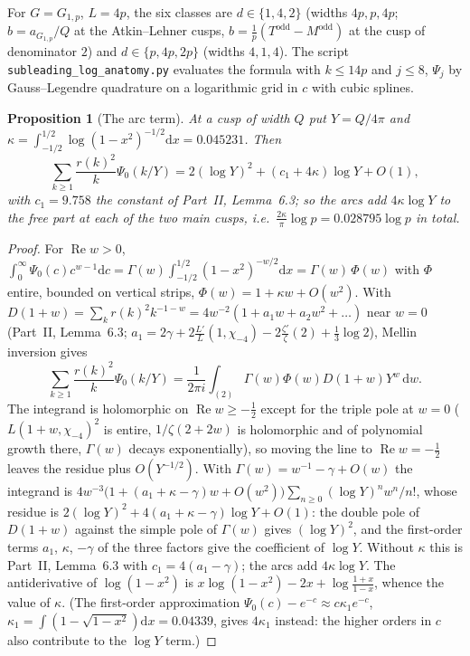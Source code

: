 \documentclass[11pt]{amsart}
\newtheorem{proposition}[theorem]{Proposition}
\theoremstyle{remark}
\newcommand{\dd}{\mathrm{d}}
\begin{document}
For $G=G_{1,p}$, $L=4p$, the six classes are $d\in\{1,4,2\}$ (widths $4p,p,4p$; $b=a_{G_{1,p}}/Q$ at the Atkin--Lehner cusps, $b=\frac1p(T^{\mathrm{odd}}-M^{\mathrm{odd}})$ at the cusp of denominator $2$) and $d\in\{p,4p,2p\}$ (widths $4,1,4$). The script \texttt{subleading\_log\_anatomy.py} evaluates the formula with $k\le14p$ and $j\le8$, $\Psi_j$ by Gauss--Legendre quadrature on a logarithmic grid in $c$ with cubic splines.

\begin{proposition}[The arc term]\label{prop:mellin}
At a cusp of width $Q$ put $Y=Q/4\pi$ and $\kappa=\int_{-1/2}^{1/2}\log(1-x^2)^{-1/2}\dd x=0.045231$. Then
\[
\sum_{k\ge1}\frac{r(k)^2}k\Psi_0(k/Y)=2(\log Y)^2+(c_1+4\kappa)\log Y+O(1),
\]
with $c_1=9.758$ the constant of Part~II, Lemma~6.3; so the arcs add $4\kappa\log Y$ to the free part at each of the two main cusps, i.e.\ $\frac{2\kappa}\pi\log p=0.028795\log p$ in total.
\end{proposition}
\begin{proof}
For $\operatorname{Re}w>0$, $\int_0^\infty\Psi_0(c)c^{w-1}\dd c=\Gamma(w)\int_{-1/2}^{1/2}(1-x^2)^{-w/2}\dd x=\Gamma(w)\,\Phi(w)$ with $\Phi$ entire, bounded on vertical strips, $\Phi(w)=1+\kappa w+O(w^2)$. With $D(1+w)=\sum_kr(k)^2k^{-1-w}=4w^{-2}(1+a_1w+a_2w^2+\dots)$ near $w=0$ (Part~II, Lemma~6.3; $a_1=2\gamma+2\frac{L'}L(1,\chi_{-4})-2\frac{\zeta'}\zeta(2)+\frac13\log2$), Mellin inversion gives
\[
\sum_{k\ge1}\frac{r(k)^2}k\Psi_0(k/Y)=\frac1{2\pi i}\int_{(2)}\Gamma(w)\Phi(w)D(1+w)Y^w\,\dd w .
\]
The integrand is holomorphic on $\operatorname{Re}w\ge-\frac12$ except for the triple pole at $w=0$ ($L(1+w,\chi_{-4})^2$ is entire, $1/\zeta(2+2w)$ is holomorphic and of polynomial growth there, $\Gamma(w)$ decays exponentially), so moving the line to $\operatorname{Re}w=-\frac12$ leaves the residue plus $O(Y^{-1/2})$. With $\Gamma(w)=w^{-1}-\gamma+O(w)$ the integrand is $4w^{-3}\bigl(1+(a_1+\kappa-\gamma)w+O(w^2)\bigr)\sum_{n\ge0}(\log Y)^nw^n/n!$, whose residue is $2(\log Y)^2+4(a_1+\kappa-\gamma)\log Y+O(1)$: the double pole of $D(1+w)$ against the simple pole of $\Gamma(w)$ gives $(\log Y)^2$, and the first-order terms $a_1$, $\kappa$, $-\gamma$ of the three factors give the coefficient of $\log Y$. Without $\kappa$ this is Part~II, Lemma~6.3 with $c_1=4(a_1-\gamma)$; the arcs add $4\kappa\log Y$. The antiderivative of $\log(1-x^2)$ is $x\log(1-x^2)-2x+\log\frac{1+x}{1-x}$, whence the value of $\kappa$. (The first-order approximation $\Psi_0(c)-e^{-c}\approx c\kappa_1e^{-c}$, $\kappa_1=\int(1-\sqrt{1-x^2})\dd x=0.04339$, gives $4\kappa_1$ instead: the higher orders in $c$ also contribute to the $\log Y$ term.)
\end{proof}
\end{document}
